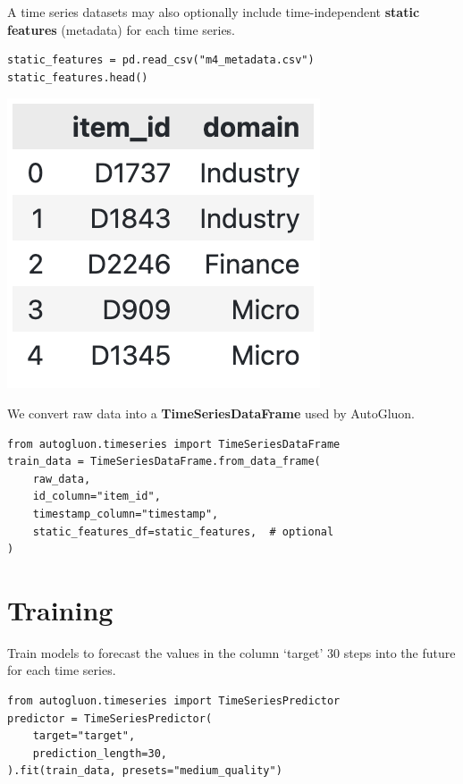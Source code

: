 \medskip

A time series datasets may also optionally include time-independent \textbf{static features} (metadata) for each time series.

\begin{verbatim}
static_features = pd.read_csv("m4_metadata.csv")
static_features.head()
\end{verbatim}

\begin{center}
\includegraphics[width=0.30\linewidth]{timeseries/images/static_features.png}
\end{center}

\medskip

We convert raw data into a \textbf{TimeSeriesDataFrame} used by AutoGluon.

\begin{verbatim}
from autogluon.timeseries import TimeSeriesDataFrame
train_data = TimeSeriesDataFrame.from_data_frame(
    raw_data,
    id_column="item_id",
    timestamp_column="timestamp",
    static_features_df=static_features,  # optional
)
\end{verbatim}


\vfill\null
\columnbreak

\section*{Training}

Train models to forecast the values in the column ‘target’ 30 steps into the future for each time series.

\begin{verbatim}
from autogluon.timeseries import TimeSeriesPredictor
predictor = TimeSeriesPredictor(
    target="target",
    prediction_length=30,
).fit(train_data, presets="medium_quality")
\end{verbatim}

